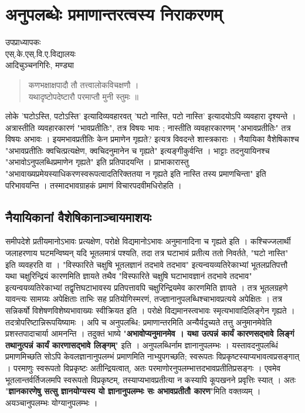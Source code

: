 \chapter{अनुपलब्धेः प्रमाणान्तरत्वस्य निराकरणम्}

\begin{center}
\smallskip

उपप्राध्यापकः\\
एस्.के.एस्.वि.ए.विद्यालयः\\
आदिचुञ्चनगिरिः, मण्ड्या
\addrule
\end{center}

\begin{verse}
कणभक्षाक्षपादौ तौ तत्त्वालोकविचक्षणौ ।\\
यथादृष्टोपदेष्टारौ परमाप्तौ मुनी स्तुमः ॥
\end{verse}
लोके  'घटोऽस्ति, पटोऽस्ति' इत्यादिव्यवहारवत् 'घटो नास्ति, पटो नास्ति' इत्यादयोऽपि व्यवहारा दृश्यन्ते । अत्रास्तीति व्यवहारकारणं "भावप्रतीतिः", तत्र विषयः भावः ; नास्तीति व्यवहारकारणम् "अभावप्रतीतिः" तत्र विषयः अभावः । इयमभावप्रतीतिः केन प्रमाणेन गृह्यते? इत्यत्र विवदन्ते शास्त्रकाराः । नैयायिका वैशेषिकाश्च "अभावप्रतीतिः क्वचित्प्रत्यक्षेण, क्वचिदनुमानेन च गृह्यते" इत्यङ्गीकुर्वन्ति । भाट्टाः तदनुयायिनश्च "अभावोऽनुपलब्धिप्रमाणेन गृह्यते" इति प्रतिपादयन्ति । प्राभाकारास्तु "अभावाख्यप्रमेयस्याधिकरणस्वरूपत्वादतिरिक्ततया न गृह्यते इति नास्ति तस्य प्रमाणचिन्ता" इति परिभावयन्ति । तस्मादभावग्राहकं प्रमाणं विचारपदवीमधिरोहति ।
 
\section*{नैयायिकानां वैशेषिकानाञ्चायमाशयः} 

समीपदेशे प्रतीयमानोऽभावः प्रत्यक्षेण, परोक्षे विद्यमानोऽभावः अनुमानादिना च गृह्यते इति । कश्चिज्जलार्थी जलाहरणाय घटमन्विष्यन् यदि भूतलमात्रं पश्यति, तदा तत्र घटाभावं प्रतीत्य ततो निवर्तते, "घटो नास्ति" इति व्यवहरति वा । "विस्फारिते चक्षुषि भूतलज्ञानं तदभावे तदभाव" इत्यन्वयव्यतिरेकाभ्यां भूतलप्रतिपत्तौ यथा चक्षुरिन्द्रियं कारणमिति ज्ञायते तथैव "विस्फारिते चक्षुषि घटाभावज्ञानं तदभावे तदभाव" इत्यन्वयव्यतिरेकाभ्यां तद्वृत्तिघटाभावस्य प्रतिपत्तावपि चक्षुरिन्द्रियमेव कारणमिति ज्ञायते । तत्र भूतलग्रहणे यावन्त्यः सामग्र्यः अपेक्षिताः ताभिः सह प्रतियोगिस्मरणं, तज्ज्ञानानुपलब्धिश्चाभावप्रत्यये अपेक्षितः । तत्र सन्निकर्षो विशेषणविशेष्यभावाख्यः स्वीक्रियत इति । परोक्षे विद्यमानस्त्वभावः स्मृत्यभावादिलिङ्गेन गृह्यते । तदत्रोपरिष्टान्निरूपयिष्यामः । अपि च अनुपलब्धि: प्रमाणान्तरमिति अन्यैर्यदुच्यते तत्तु अनुमानमेवेति प्रशस्तपादाचार्या आमनन्ति । तदुक्तं भाष्ये "\textbf{अभावोप्यनुमानमेव । यथा उत्पन्नं कार्यं कारणसद्भावे लिङ्गं तथानुत्पन्नं कार्यं कारणासद्भावे लिङ्गम्}" इति । अनुपलब्धिर्नाम ज्ञानानुपलम्भः । यस्तावदनुपलब्धिं प्रमाणमिच्छति सोऽपि केवलज्ञानानुपलम्भं प्रमाणमिति नाभ्युपगच्छति; स्वरूपतः विप्रकृष्टस्याप्यभावत्वप्रसङ्गात् । परमाणुः स्वरूपतो विप्रकृष्टः अतीन्द्रियत्वात्, अतः परमाणोरनुपलम्भात्तदभावप्रतीतिप्रसङ्गः । एवमेव भूतलान्तर्वर्तिजलमपि स्वरूपतो विप्रकृष्टम्, तस्याप्यभावप्रतीत्या न कस्यापि कूपखनने प्रवृत्तिः स्यात् । अतः "\textbf{ज्ञानकारणेषु सत्सु ज्ञानयोग्यस्य यो ज्ञानानुपलम्भः सः अभावप्रतीतौ कारण}"मिति वक्तव्यम् । अयञ्चानुपलम्भः योग्यानुपलम्भः ।

